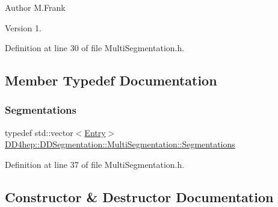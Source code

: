 \begin{DoxyAuthor}{Author}
M.\+Frank 
\end{DoxyAuthor}
\begin{DoxyVersion}{Version}
1. 
\end{DoxyVersion}


Definition at line 30 of file Multi\+Segmentation.\+h.



\subsection{Member Typedef Documentation}
\hypertarget{class_d_d4hep_1_1_d_d_segmentation_1_1_multi_segmentation_a083ba7cc081c5c3c47cafac5980100f8}{}\label{class_d_d4hep_1_1_d_d_segmentation_1_1_multi_segmentation_a083ba7cc081c5c3c47cafac5980100f8} 
\subsubsection{\texorpdfstring{Segmentations}{Segmentations}}
{\footnotesize\ttfamily typedef std\+::vector$<$\hyperlink{struct_d_d4hep_1_1_d_d_segmentation_1_1_multi_segmentation_1_1_entry}{Entry}$>$ \hyperlink{class_d_d4hep_1_1_d_d_segmentation_1_1_multi_segmentation_a083ba7cc081c5c3c47cafac5980100f8}{D\+D4hep\+::\+D\+D\+Segmentation\+::\+Multi\+Segmentation\+::\+Segmentations}}



Definition at line 37 of file Multi\+Segmentation.\+h.



\subsection{Constructor \& Destructor Documentation}
\hypertarget{class_d_d4hep_1_1_d_d_segmentation_1_1_multi_segmentation_ad1a80e739f693a231afc09295a565e85}{}\label{class_d_d4hep_1_1_d_d_segmentation_1_1_multi_segmentation_ad1a80e739f693a231afc09295a565e85} 
